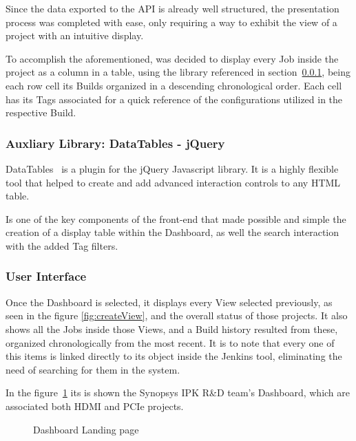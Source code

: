 Since the data exported to the API is already well structured, the presentation process was completed with ease, only requiring a way to exhibit the view of a project with an intuitive display. 

To accomplish the aforementioned, was decided to display every Job inside the project as a column in a table, using the library referenced in section~\ref{sc:datatables}, being each row cell its Builds organized in a descending chronological order. Each cell has its Tags associated for a quick reference of the configurations utilized in the respective Build.



\subsubsection{Auxliary Library: DataTables - jQuery}\label{sc:datatables}

DataTables~\cite{dataTables} is a plugin for the jQuery Javascript library. 
It is a highly flexible tool that helped to create and add advanced interaction controls to any HTML table.

Is one of the key components of the front-end that made possible and simple the creation of a display table within the Dashboard, as well the search interaction with the added Tag filters.

\subsubsection{User Interface}\label{sc:ui}

Once the Dashboard is selected, it displays every View selected previously, as seen in the figure \ref{fig:createView}, and the overall status of those projects. It also shows all the Jobs inside those Views, and a Build history resulted from these, organized chronologically from the most recent. It is to note that every one of this items is linked directly to its object inside the Jenkins tool, eliminating the need of searching for them in the system.
  
In the figure~\ref{fig:mainDashb} its is shown the Synopsys IPK R\&D team's Dashboard, which are associated both HDMI and PCIe projects.
  
\begin{figure}[H]
  \centering
      \caption{Dashboard Landing page}
      \label{fig:mainDashb}
  \end{figure}
  
